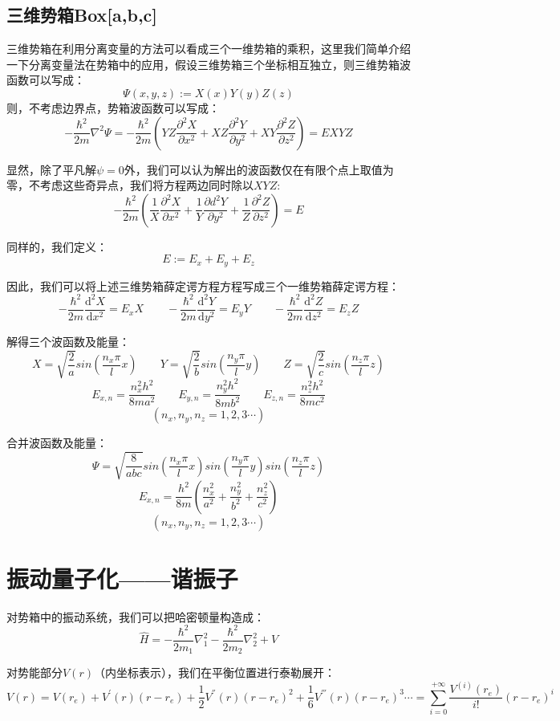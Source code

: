 \subsection{三维势箱Box[a,b,c]}
三维势箱在利用分离变量的方法可以看成三个一维势箱的乘积，这里我们简单介绍一下分离变量法在势箱中的应用，假设三维势箱三个坐标相互独立，则三维势箱波函数可以写成：
\[\varPsi(x,y,z):=X(x)Y(y)Z(z)\]
则，不考虑边界点，势箱波函数可以写成：
\[-\frac{\hbar^2}{2m}\nabla^2\varPsi=-\frac{\hbar^2}{2m}\left (YZ\frac{\partial^2X}{\partial x^2}+XZ\frac{\partial^2Y}{\partial y^2}+XY\frac{\partial^2Z}{\partial z^2} \right )=EXYZ\]

显然，除了平凡解$\psi=0$外，我们可以认为解出的波函数仅在有限个点上取值为零，不考虑这些奇异点，我们将方程两边同时除以$XYZ$:
\[-\frac{\hbar^2}{2m}\left (\frac{1}{X}\frac{\partial^2X}{\partial x^2}+\frac{1}{Y}\frac{\partial{d}^2Y}{\partial y^2}+\frac{1}{Z}\frac{\partial^2Z}{\partial z^2} \right )=E\]

同样的，我们定义：
\[E:=E_x+E_y+E_z\]

因此，我们可以将上述三维势箱薛定谔方程方程写成三个一维势箱薛定谔方程：
\[-\frac{\hbar^2}{2m}\frac{\mathrm{d}^2X}{\mathrm{d}x^2}=E_xX \qquad -\frac{\hbar^2}{2m}\frac{\mathrm{d}^2Y}{\mathrm{d}y^2}=E_yY \qquad -\frac{\hbar^2}{2m}\frac{\mathrm{d}^2Z}{\mathrm{d}z^2}=E_zZ\]

解得三个波函数及能量：
\[X=\sqrt{\frac{2}{a}}sin\left (\frac{n_x \pi}{l}x \right ) \qquad Y=\sqrt{\frac{2}{b}}sin\left (\frac{n_y \pi}{l}y \right ) \qquad Z=\sqrt{\frac{2}{c}}sin\left (\frac{n_z \pi}{l}z \right )\]
\[E_{x,n}=\frac{n_x^2 h^2}{8ma^2} \qquad E_{y,n}=\frac{n_y^2 h^2}{8mb^2} \qquad E_{z,n}=\frac{n_z^2 h^2}{8mc^2}\]
\[(n_x,n_y,n_z=1,2,3 \cdots)\]

合并波函数及能量：
\[\varPsi=\sqrt{\frac{8}{abc}}sin\left (\frac{n_x \pi}{l}x \right )sin\left (\frac{n_y \pi}{l}y \right )sin\left (\frac{n_z \pi}{l}z \right )\]
\[E_{x,n}=\frac{h^2}{8m} \left (\frac{n_x^2}{a^2}+\frac{n_y^2}{b^2}+\frac{n_z^2}{c^2} \right )\]
\[(n_x,n_y,n_z=1,2,3 \cdots)\]

\section{振动量子化——谐振子}
对势箱中的振动系统，我们可以把哈密顿量构造成：
\[\hat{H}=-\frac{\hbar^2}{2m_1}\nabla^2_1-\frac{\hbar^2}{2m_2}\nabla^2_2+V\]

对势能部分$V(r)$（内坐标表示），我们在平衡位置进行泰勒展开：
\[V(r)=V(r_e)+V^{'}(r)(r-r_e)+\frac{1}{2}V^{''}(r)(r-r_e)^2+\frac{1}{6}V^{'''}(r)(r-r_e)^3 \cdots=\sum_{i=0}^{+\infty}\frac{V^{(i)}(r_e)}{i!}(r-r_e)^i\]

